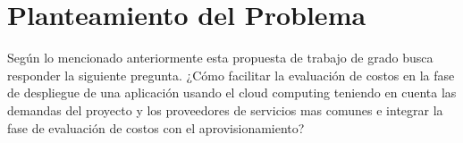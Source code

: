 
\chapter{Planteamiento del Problema} %

\label{ch:problema} %



\bigskip
Según lo mencionado anteriormente esta propuesta de trabajo de grado busca responder la siguiente pregunta. ¿Cómo facilitar la evaluación de costos en la fase de despliegue de una aplicación usando el cloud computing teniendo en cuenta las demandas del proyecto y los proveedores de servicios mas comunes e integrar la fase de evaluación de costos con el aprovisionamiento?
